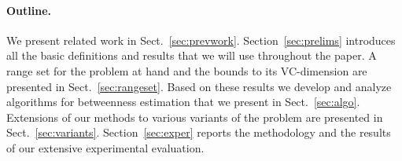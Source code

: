 \paragraph*{Outline\ifdmkd.~\fi} 
 We present related work in Sect.~\ref{sec:prevwork}. Section~\ref{sec:prelims}
introduces all the basic definitions and results that we will use throughout the
paper. A range set for the problem at hand and the bounds to its VC-dimension
are presented in Sect.~\ref{sec:rangeset}. Based on these results we develop and
analyze algorithms for betweenness estimation that we present in
Sect.~\ref{sec:algo}. %
\ifproof
Extensions of our methods to various variants of the problem are presented in
Sect.~\ref{sec:variants}. %
\fi 
Section~\ref{sec:exper} reports the methodology and
the results of our extensive experimental evaluation.

